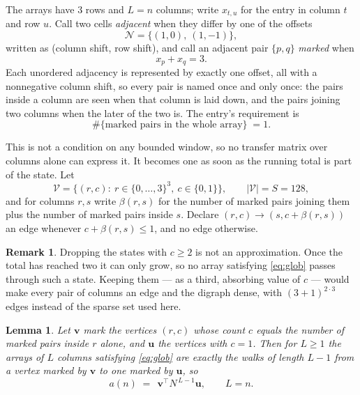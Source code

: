 \documentclass[11pt,a4paper]{article}
\theoremstyle{plain}
\newtheorem{lemma}[theorem]{Lemma}
\theoremstyle{definition}
\newtheorem{remark}[theorem]{Remark}
\begin{document}
The arrays have $3$ rows and $L=n$ columns; write $x_{t,u}$ for the entry in
column $t$ and row $u$. Call two cells \emph{adjacent} when they differ by one of the
offsets
\[
\mathcal N=\{(1,0),\ (1,-1)\},
\]
written as (column shift, row shift), and call an adjacent pair $\{p,q\}$
\emph{marked} when
\[
x_{p}+x_{q}=3 .
\]
Each unordered adjacency is represented by exactly one offset, all with a nonnegative column
shift, so every pair is named once and only once: the pairs inside a column are seen when
that column is laid down, and the pairs joining two columns when the later of the two is. The
entry's requirement is
\begin{equation}\label{eq:glob}
\#\{\text{marked pairs in the whole array}\}\;=1.
\end{equation}

This is not a condition on any bounded window, so no transfer matrix over columns alone can
express it. It becomes one as soon as the running total is part of the state. Let
\[
\mathcal V=\bigl\{(r,c):\ r\in\{0,\dots,3\}^{3},\ c\in\{0,1\}\bigr\},
\qquad |\mathcal V|=S=128,
\]
and for columns $r,s$ write $\beta(r,s)$ for the number of marked pairs joining them plus the
number of marked pairs inside $s$. Declare $(r,c)\to(s,c+\beta(r,s))$ an edge whenever
$c+\beta(r,s)\le1$, and no edge otherwise.

\begin{remark}
Dropping the states with $c\ge2$ is not an approximation. Once the total has reached two it
can only grow, so no array satisfying \eqref{eq:glob} passes through such a state. Keeping
them --- as a third, absorbing value of $c$ --- would make every pair of columns an edge and
the digraph dense, with $(3+1)^{2\cdot3}$ edges instead of the sparse set used here.
\end{remark}

\begin{lemma}\label{lem:walk}
Let $\mathbf{v}$ mark the vertices $(r,c)$ whose count $c$ equals the number of marked pairs
inside $r$ alone, and $\mathbf{u}$ the vertices with $c=1$. Then for $L\ge1$ the arrays
of $L$ columns satisfying \eqref{eq:glob} are exactly the walks of length $L-1$ from a
vertex marked by $\mathbf{v}$ to one marked by $\mathbf{u}$, so
\[
a(n)\;=\;\,\mathbf{v}^{\!\top}N^{\,L-1}\mathbf{u},\qquad L=n .
\]
\end{lemma}
\end{document}
